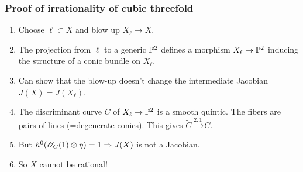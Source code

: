 \begin{frame}
\frametitle{Proof of irrationality of cubic threefold}

\begin{enumerate}
	\item Choose $\ell \subset X$ and blow up $X_\ell \to X$.
	\pause
	\item The projection from $\ell$ to a generic $\P^2$ defines a morphism $X_\ell \to \P^2$ inducing the structure of a conic bundle on $X_\ell$.
	\pause
	\item Can show that the blow-up doesn't change the intermediate Jacobian $J(X)=J(X_\ell)$.
	\pause
	\item The discriminant curve $C$ of $X_\ell \to \P^2$ is a smooth quintic. The fibers are pairs of lines (=degenerate conics). This gives $\widetilde C \xrightarrow{2:1} C$.
	\pause
	\item But $h^0(\OO_C(1) \otimes \eta)=1 \Rightarrow J(X)$ is not a Jacobian.
	\pause
	\item So $X$ cannot be rational!
\end{enumerate}

\end{frame}